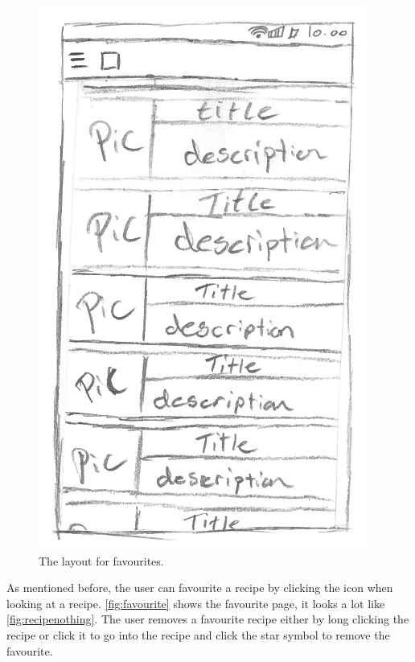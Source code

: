 \begin{figure}[H]
\centering
\includegraphics[width=0.35\linewidth]{img/prototypes/favorites.pdf}
\caption{The layout for favourites.}
\label{fig:favourite}
\end{figure}

As mentioned before, the user can favourite a recipe by clicking the icon when looking at a recipe. \autoref{fig:favourite} shows the favourite page, it looks a lot like \autoref{fig:recipenothing}. The user removes a favourite recipe either by long clicking the recipe or click it to go into the recipe and click the star symbol to remove the favourite.

